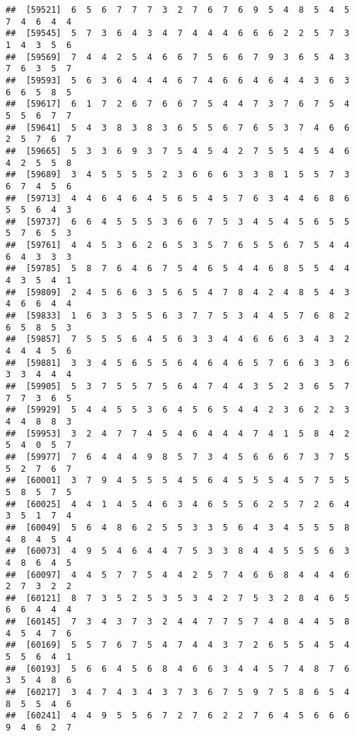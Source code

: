 \documentclass[
]{book}
\begin{document}
\begin{verbatim}
##  [59521]  6  5  6  7  7  7  3  2  7  6  7  6  9  5  4  8  5  4  5  7  4  6  4  4
##  [59545]  5  7  3  6  4  3  4  7  4  4  4  6  6  6  2  2  5  7  3  1  4  3  5  6
##  [59569]  7  4  4  2  5  4  6  6  7  5  6  6  7  9  3  6  5  4  3  7  6  3  5  7
##  [59593]  5  6  3  6  4  4  4  6  7  4  6  6  4  6  4  4  3  6  3  6  6  5  8  5
##  [59617]  6  1  7  2  6  7  6  6  7  5  4  4  7  3  7  6  7  5  4  5  5  6  7  7
##  [59641]  5  4  3  8  3  8  3  6  5  5  6  7  6  5  3  7  4  6  6  2  5  7  6  7
##  [59665]  5  3  3  6  9  3  7  5  4  5  4  2  7  5  5  4  5  4  6  4  2  5  5  8
##  [59689]  3  4  5  5  5  5  2  3  6  6  6  3  3  8  1  5  5  7  3  6  7  4  5  6
##  [59713]  4  4  6  4  6  4  5  6  5  4  5  7  6  3  4  4  6  8  6  5  5  6  4  3
##  [59737]  6  6  4  5  5  5  3  6  6  7  5  3  4  5  4  5  6  5  5  5  7  6  5  3
##  [59761]  4  4  5  3  6  2  6  5  3  5  7  6  5  5  6  7  5  4  4  6  4  3  3  3
##  [59785]  5  8  7  6  4  6  7  5  4  6  5  4  4  6  8  5  5  4  4  4  3  5  4  1
##  [59809]  2  4  5  6  6  3  5  6  5  4  7  8  4  2  4  8  5  4  3  4  6  6  4  4
##  [59833]  1  6  3  3  5  5  6  3  7  7  5  3  4  4  5  7  6  8  2  6  5  8  5  3
##  [59857]  7  5  5  5  6  4  5  6  3  3  4  4  6  6  6  3  4  3  2  4  4  4  5  6
##  [59881]  3  3  4  5  6  5  5  6  4  6  4  6  5  7  6  6  3  3  6  3  3  4  4  4
##  [59905]  5  3  7  5  5  7  5  6  4  7  4  4  3  5  2  3  6  5  7  7  7  3  6  5
##  [59929]  5  4  4  5  5  3  6  4  5  6  5  4  4  2  3  6  2  2  3  4  4  8  8  3
##  [59953]  3  2  4  7  7  4  5  4  6  4  4  4  7  4  1  5  8  4  2  5  4  0  5  7
##  [59977]  7  6  4  4  4  9  8  5  7  3  4  5  6  6  6  7  3  7  5  5  2  7  6  7
##  [60001]  3  7  9  4  5  5  5  4  5  6  4  5  5  5  4  5  7  5  5  5  8  5  7  5
##  [60025]  4  4  1  4  5  4  6  3  4  6  5  5  6  2  5  7  2  6  4  3  5  1  7  4
##  [60049]  5  6  4  8  6  2  5  5  3  3  5  6  4  3  4  5  5  5  8  4  8  4  5  4
##  [60073]  4  9  5  4  6  4  4  7  5  3  3  8  4  4  5  5  5  6  3  4  8  6  4  5
##  [60097]  4  4  5  7  7  5  4  4  2  5  7  4  6  6  8  4  4  4  6  2  7  3  2  2
##  [60121]  8  7  3  5  2  5  3  5  3  4  2  7  5  3  2  8  4  6  5  6  6  4  4  4
##  [60145]  7  3  4  3  7  3  2  4  4  7  7  5  7  4  8  4  4  5  8  4  5  4  7  6
##  [60169]  5  5  7  6  7  5  4  7  4  4  3  7  2  6  5  5  4  5  4  5  5  6  4  1
##  [60193]  5  6  6  4  5  6  8  4  6  6  3  4  4  5  7  4  8  7  6  3  5  4  8  6
##  [60217]  3  4  7  4  3  4  3  7  3  6  7  5  9  7  5  8  6  5  4  8  5  5  4  6
##  [60241]  4  4  9  5  5  6  7  2  7  6  2  2  7  6  4  5  6  6  6  9  4  6  2  7

\end{verbatim}
\end{document}

